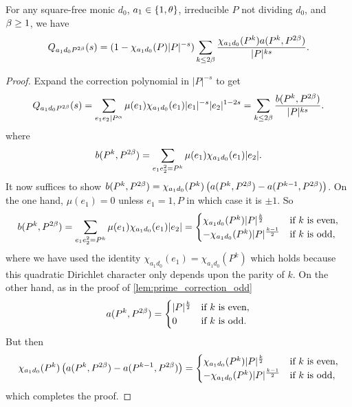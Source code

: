 \documentclass[12pt,reqno,oneside]{amsart}
\begin{document}
    \begin{lemma}\label{lem:prime_correction_even}
        For any square-free monic $d_{0}$, $a_{1} \in \{1,\theta\}$, irreducible $P$ not dividing $d_{0}$, and $\beta \ge 1$, we have
        \[
            Q_{a_{1}d_{0}P^{2\beta}}(s) = (1-\chi_{a_{1}d_{0}}(P)|P|^{-s})\sum_{k \le 2\beta}\frac{\chi_{a_{1}d_{0}}(P^{k})a(P^{k},P^{2\beta})}{|P|^{ks}}.
        \]
    \end{lemma}
    \begin{proof}
        Expand the correction polynomial in $|P|^{-s}$ to get
        \[
            Q_{a_{1}d_{0}P^{2\beta}}(s) = \sum_{e_{1}e_{2} \mid P^{\alpha}}\mu(e_{1})\chi_{a_{1}d_{0}}(e_{1})|e_{1}|^{-s}|e_{2}|^{1-2s} = \sum_{k \le 2\beta}\frac{b(P^{k},P^{2\beta})}{|P|^{ks}}.
        \]
        where
        \[
            b(P^{k},P^{2\beta}) = \sum_{e_{1}e_{2}^{2} = P^{k}}\mu(e_{1})\chi_{a_{1}d_{0}}(e_{1})|e_{2}|.
        \]
        It now suffices to show $b(P^{k},P^{2\beta}) = \chi_{a_{1}d_{0}}(P^{k})\left(a(P^{k},P^{2\beta})-a(P^{k-1},P^{2\beta})\right)$. On the one hand, $\mu(e_{1}) = 0$ unless $e_{1} = 1,P$ in which case it is $\pm1$. So
        \[
            b(P^{k},P^{2\beta}) = \sum_{e_{1}e_{2}^{2} = P^{k}}\mu(e_{1})\chi_{a_{1}d_{0}}(e_{1})|e_{2}| = \begin{cases} \chi_{a_{1}d_{0}}(P^{k})|P|^{\frac{k}{2}} & \text{if $k$ is even}, \\ -\chi_{a_{1}d_{0}}(P^{k})|P|^{\frac{k-1}{2}} & \text{if $k$ is odd}, \end{cases}
        \]
        where we have used the identity $\chi_{a_{1}d_{0}}(e_{1}) = \chi_{a_{1}d_{0}}(P^{k})$ which holds because this quadratic Dirichlet character only depends upon the parity of $k$. On the other hand, as in the proof of \cref{lem:prime_correction_odd} 
        \[
            a(P^{k},P^{2\beta}) = \begin{cases} |P|^{\frac{k}{2}} & \text{if $k$ is even}, \\ 0 & \text{if $k$ is odd}. \end{cases}
        \]
        But then
        \[
            \chi_{a_{1}d_{0}}(P^{k})\left(a(P^{k},P^{2\beta})-a(P^{k-1},P^{2\beta})\right) = \begin{cases} \chi_{a_{1}d_{0}}(P^{k})|P|^{\frac{k}{2}} & \text{if $k$ is even}, \\ -\chi_{a_{1}d_{0}}(P^{k})|P|^{\frac{k-1}{2}} & \text{if $k$ is odd}, \end{cases}
        \]
        which completes the proof.
    \end{proof}
\end{document}
